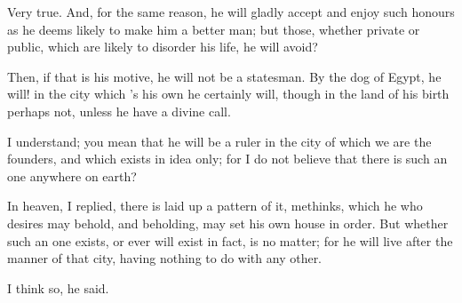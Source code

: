 Very true.
And, for the same reason, he will gladly accept and enjoy such honours as he deems likely to make him a better man; but those, whether private or public, which are likely to disorder his life, he will avoid?

Then, if that is his motive, he will not be a statesman.
By the dog of Egypt, he will! in the city which 's his own he certainly will, though in the land of his birth perhaps not, unless he have a divine call.

I understand; you mean that he will be a ruler in the city of which we are the founders, and which exists in idea only; for I do not believe that there is such an one anywhere on earth?

In heaven, I replied, there is laid up a pattern of it, methinks, which he who desires may behold, and beholding, may set his own house in order. But whether such an one exists, or ever will exist in fact, is no matter; for he will live after the manner of that city, having nothing to do with any other.

I think so, he said.